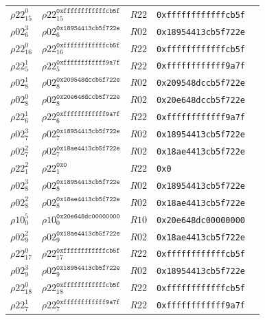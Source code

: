 \begin{longtable}[c]{|l|l|l|l|l|}
  $\rho22_{15}^{0}$ & $\rho22_{15}^{\texttt{0xffffffffffffcb5f}}$ & $R22$ &
  \texttt{0xffffffffffffcb5f} \\
  $\rho02_{6}^{3}$ & $\rho02_{6}^{\texttt{0x18954413cb5f722e}}$ & $R02$ &
  \texttt{0x18954413cb5f722e} \\
  $\rho22_{16}^{0}$ & $\rho22_{16}^{\texttt{0xffffffffffffcb5f}}$ & $R22$ &
  \texttt{0xffffffffffffcb5f} \\
  $\rho22_{5}^{1}$ & $\rho22_{5}^{\texttt{0xffffffffffff9a7f}}$ & $R22$ &
  \texttt{0xffffffffffff9a7f} \\
  $\rho02_{8}^{1}$ & $\rho02_{8}^{\texttt{0x209548dccb5f722e}}$ & $R02$ &
  \texttt{0x209548dccb5f722e} \\
  $\rho02_{8}^{0}$ & $\rho02_{8}^{\texttt{0x20e648dccb5f722e}}$ & $R02$ &
  \texttt{0x20e648dccb5f722e} \\
  $\rho22_{6}^{1}$ & $\rho22_{6}^{\texttt{0xffffffffffff9a7f}}$ & $R22$ &
  \texttt{0xffffffffffff9a7f} \\
  $\rho02_{7}^{3}$ & $\rho02_{7}^{\texttt{0x18954413cb5f722e}}$ & $R02$ &
  \texttt{0x18954413cb5f722e} \\
  $\rho02_{7}^{2}$ & $\rho02_{7}^{\texttt{0x18ae4413cb5f722e}}$ & $R02$ &
  \texttt{0x18ae4413cb5f722e} \\
  $\rho22_{1}^{2}$ & $\rho22_{1}^{\texttt{0x0}}$ & $R22$ & \texttt{0x0} \\
  $\rho02_{8}^{3}$ & $\rho02_{8}^{\texttt{0x18954413cb5f722e}}$ & $R02$ &
  \texttt{0x18954413cb5f722e} \\
  $\rho02_{8}^{2}$ & $\rho02_{8}^{\texttt{0x18ae4413cb5f722e}}$ & $R02$ &
  \texttt{0x18ae4413cb5f722e} \\
  $\rho10_{0}^{5}$ & $\rho10_{0}^{\texttt{0x20e648dc00000000}}$ & $R10$ &
  \texttt{0x20e648dc00000000} \\
  $\rho02_{9}^{2}$ & $\rho02_{9}^{\texttt{0x18ae4413cb5f722e}}$ & $R02$ &
  \texttt{0x18ae4413cb5f722e} \\
  $\rho22_{17}^{0}$ & $\rho22_{17}^{\texttt{0xffffffffffffcb5f}}$ & $R22$ &
  \texttt{0xffffffffffffcb5f} \\
  $\rho02_{9}^{3}$ & $\rho02_{9}^{\texttt{0x18954413cb5f722e}}$ & $R02$ &
  \texttt{0x18954413cb5f722e} \\
  $\rho22_{18}^{0}$ & $\rho22_{18}^{\texttt{0xffffffffffffcb5f}}$ & $R22$ &
  \texttt{0xffffffffffffcb5f} \\
  $\rho22_{7}^{1}$ & $\rho22_{7}^{\texttt{0xffffffffffff9a7f}}$ & $R22$ &
  \texttt{0xffffffffffff9a7f} \\

\end{longtable}
